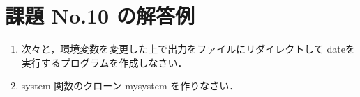 \documentclass[a4j,twcolumn,11pt,nomag]{ltjarticle}      %
\begin{document}
\onecolumn

\section*{課題 No.10 の解答例}
\begin{enumerate}
\item 次々と，環境変数を変更した上で出力をファイルにリダイレクトして
  dateを実行するプログラムを作成しなさい．
\item system 関数のクローン mysystem を作りなさい．
\end{enumerate}
\end{document}
